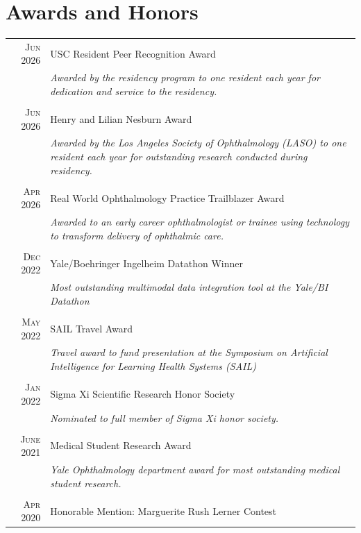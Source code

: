 \documentclass[a4paper,10pt]{article}
\begin{document}
\section{Awards and Honors}
\begin{tabular}{rp{11cm}}
\textsc{Jun} 2026 & USC Resident Peer Recognition Award \\
 							    & \small\emph{Awarded by the residency program to one resident each year for dedication and service to the residency.} \\
 \multicolumn{2}{c}{} \\
\textsc{Jun} 2026 & Henry and Lilian Nesburn Award \\
 							    & \small\emph{Awarded by the Los Angeles Society of Ophthalmology (LASO) to one resident each year for outstanding research conducted during residency.} \\
 \multicolumn{2}{c}{} \\
\textsc{Apr} 2026 & Real World Ophthalmology Practice Trailblazer Award \\
 							    & \small\emph{Awarded to an early career ophthalmologist or trainee using technology to transform delivery of ophthalmic care.} \\
 \multicolumn{2}{c}{} \\
\textsc{Dec} 2022 & Yale/Boehringer Ingelheim Datathon Winner \\
 							    & \small\emph{Most outstanding multimodal data integration tool at the Yale/BI Datathon} \\
 \multicolumn{2}{c}{} \\
 \textsc{May} 2022 & SAIL Travel Award \\
 							    & \small\emph{Travel award to fund presentation at the Symposium on Artificial Intelligence for Learning Health Systems (SAIL)} \\
 \multicolumn{2}{c}{} \\
 \textsc{Jan} 2022 & Sigma Xi Scientific Research Honor Society \\
 							    & \small\emph{Nominated to full member of Sigma Xi honor society.} \\
 \multicolumn{2}{c}{} \\
 \textsc{June} 2021 & Medical Student Research Award \\
 							    & \small\emph{Yale Ophthalmology department  award for most outstanding medical student research.} \\
 \multicolumn{2}{c}{} \\
 \textsc{Apr} 2020 & Honorable Mention: Marguerite Rush Lerner Contest \\

\end{tabular}
\end{document}
